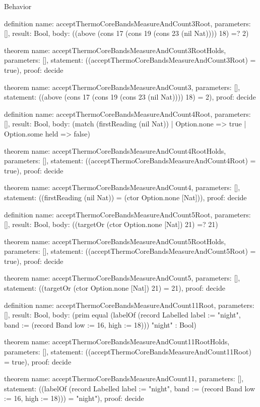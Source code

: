 \begin{lexlean}{Behavior}
\begin{semanticmodule}
definition{
  name: acceptThermoCoreBandsMeasureAndCount3Root,
  parameters: [],
  result: Bool,
  body: ((above (cons 17 (cons 19 (cons 23 (nil Nat)))) 18) =? 2)
}

theorem{
  name: acceptThermoCoreBandsMeasureAndCount3RootHolds,
  parameters: [],
  statement: ((acceptThermoCoreBandsMeasureAndCount3Root) = true),
  proof: decide{}
}

theorem{
  name: acceptThermoCoreBandsMeasureAndCount3,
  parameters: [],
  statement: ((above (cons 17 (cons 19 (cons 23 (nil Nat)))) 18) = 2),
  proof: decide{}
}

definition{
  name: acceptThermoCoreBandsMeasureAndCount4Root,
  parameters: [],
  result: Bool,
  body: (match (firstReading (nil Nat)) | Option.none => true | Option.some held => false)
}

theorem{
  name: acceptThermoCoreBandsMeasureAndCount4RootHolds,
  parameters: [],
  statement: ((acceptThermoCoreBandsMeasureAndCount4Root) = true),
  proof: decide{}
}

theorem{
  name: acceptThermoCoreBandsMeasureAndCount4,
  parameters: [],
  statement: ((firstReading (nil Nat)) = (ctor Option.none [Nat])),
  proof: decide{}
}

definition{
  name: acceptThermoCoreBandsMeasureAndCount5Root,
  parameters: [],
  result: Bool,
  body: ((targetOr (ctor Option.none [Nat]) 21) =? 21)
}

theorem{
  name: acceptThermoCoreBandsMeasureAndCount5RootHolds,
  parameters: [],
  statement: ((acceptThermoCoreBandsMeasureAndCount5Root) = true),
  proof: decide{}
}

theorem{
  name: acceptThermoCoreBandsMeasureAndCount5,
  parameters: [],
  statement: ((targetOr (ctor Option.none [Nat]) 21) = 21),
  proof: decide{}
}

definition{
  name: acceptThermoCoreBandsMeasureAndCount11Root,
  parameters: [],
  result: Bool,
  body: (prim equal (labelOf (record Labelled {label := "night", band := (record Band {low := 16, high := 18})})) "night" : Bool)
}

theorem{
  name: acceptThermoCoreBandsMeasureAndCount11RootHolds,
  parameters: [],
  statement: ((acceptThermoCoreBandsMeasureAndCount11Root) = true),
  proof: decide{}
}

theorem{
  name: acceptThermoCoreBandsMeasureAndCount11,
  parameters: [],
  statement: ((labelOf (record Labelled {label := "night", band := (record Band {low := 16, high := 18})})) = "night"),
  proof: decide{}
}


\end{semanticmodule}
\end{lexlean}
